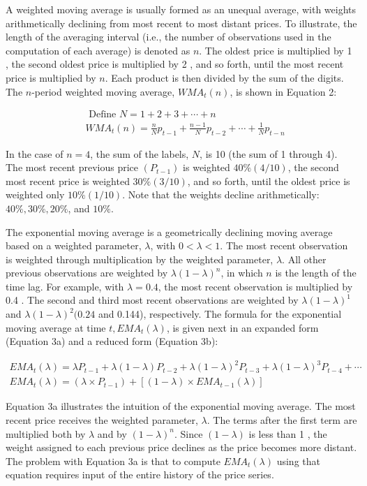 \documentclass[11pt]{article}
\begin{document}
A weighted moving average is usually formed as an unequal average, with weights arithmetically declining from most recent to most distant prices. To illustrate, the length of the averaging interval (i.e., the number of observations used in the computation of each average) is denoted as $n$. The oldest price is multiplied by 1 , the second oldest price is multiplied by 2 , and so forth, until the most recent price is multiplied by $n$. Each product is then divided by the sum of the digits. The $n$-period weighted moving average, $W M A_{t}(n)$, is shown in Equation 2:


\begin{align*}
& \text { Define } N=1+2+3+\cdots+n \\
& W M A_{t}(n)=\frac{n}{N} p_{t-1}+\frac{n-1}{N} p_{t-2}+\cdots+\frac{1}{N} p_{t-n} \tag{2}
\end{align*}


In the case of $n=4$, the sum of the labels, $N$, is 10 (the sum of 1 through 4). The most recent previous price $\left(P_{t-1}\right)$ is weighted $40 \%(4 / 10)$, the second most recent price is weighted $30 \%(3 / 10)$, and so forth, until the oldest price is weighted only $10 \%(1 / 10)$. Note that the weights decline arithmetically: $40 \%, 30 \%, 20 \%$, and $10 \%$.

The exponential moving average is a geometrically declining moving average based on a weighted parameter, $\lambda$, with $0<\lambda<1$. The most recent observation is weighted through multiplication by the weighted parameter, $\lambda$. All other previous observations are weighted by $\lambda(1-\lambda)^{n}$, in which $n$ is the length of the time lag. For example, with $\lambda=0.4$, the most recent observation is multiplied by 0.4 . The second and third most recent observations are weighted by $\lambda(1-\lambda)^{1}$ and $\lambda(1-\lambda)^{2}(0.24$ and 0.144), respectively. The formula for the exponential moving average at time $t, E M A_{t}(\lambda)$, is given next in an expanded form (Equation 3a) and a reduced form (Equation 3b):

$$
\begin{gathered}
E M A_{t}(\lambda)=\lambda P_{t-1}+\lambda(1-\lambda) P_{t-2}+\lambda(1-\lambda)^{2} P_{t-3}+\lambda(1-\lambda)^{3} P_{t-4}+\cdots \\
E M A_{t}(\lambda)=\left(\lambda \times P_{t-1}\right)+\left[(1-\lambda) \times E M A_{t-1}(\lambda)\right]
\end{gathered}
$$

Equation 3a illustrates the intuition of the exponential moving average. The most recent price receives the weighted parameter, $\lambda$. The terms after the first term are multiplied both by $\lambda$ and by $(1-\lambda)^{n}$. Since $(1-\lambda)$ is less than 1 , the weight assigned to each previous price declines as the price becomes more distant. The problem with Equation 3a is that to compute $E M A_{t}(\lambda)$ using that equation requires input of the entire history of the price series.
\end{document}
